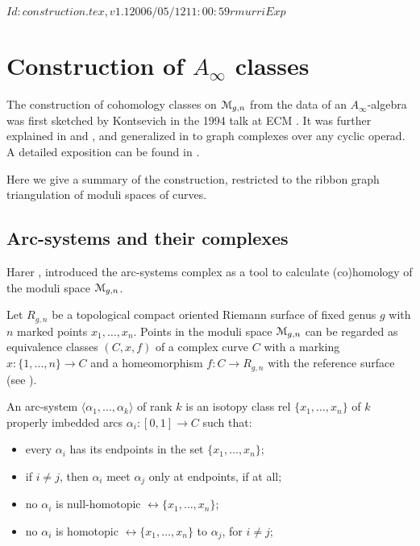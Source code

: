 \RCSID $Id: construction.tex,v 1.1 2006/05/12 11:00:59 rmurri Exp $


\chapter{Construction of $A_\infty$ classes}
\label{cha:construction}

The construction of cohomology classes on $\mathcal{M}_{g,n}$ from the data of
an $A_\infty$-algebra was first sketched by Kontsevich in the 1994 talk at
ECM \cite{kontsevich;feynman}. It was further explained in
\cite{penkava-schwarz} and \cite{penkava;graph-complexes}, and
generalized in \cite{markl;cyclic} to graph complexes over any cyclic
operad.  A detailed exposition can be found in \cite{conant-vogtmann}.

Here we give a summary of the construction, restricted to the ribbon
graph triangulation of moduli spaces of curves.


\section{Arc-systems and their complexes}
\label{sec:arc-systems}

Harer \cite{harer;cohomological-dimension}, introduced the arc-systems
complex as a tool to calculate (co)homology of the moduli space
$\mathcal{M}_{g,n}$.

Let $R_{g,n}$ be a topological compact oriented Riemann surface of
fixed genus $g$ with $n$ marked points $x_1, \ldots, x_n$.  Points in the
moduli space $\mathcal{M}_{g,n}$ can be regarded as equivalence classes
$(C,x,f)$ of a complex curve $C$ with a marking $x:\{1,\ldots,n\}\to C$ and a
homeomorphism $f:C\to R_{g,n}$ with the reference surface (see
).
\begin{definition}
  An arc-system $\langle\alpha_1, \ldots, \alpha_k\rangle$ of rank $k$ is an isotopy class rel
  $\{x_1, \ldots, x_n\}$ of $k$ properly imbedded arcs $\alpha_i : [0,1] \to C$ such
  that:
  \begin{itemize}
  \item every $\alpha_i$ has its endpoints in the set $\{x_1, \ldots, x_n\}$;
  \item if $i \neq j$, then $\alpha_i$ meet $\alpha_j$ only at endpoints, if at all;
  \item no $\alpha_i$ is null-homotopic $\rel \{x_1, \ldots, x_n\}$;
  \item no $\alpha_i$ is homotopic $\rel \{x_1, \ldots, x_n\}$ to $\alpha_j$, for $i \neq
    j$;
  \end{itemize}
\end{definition}

